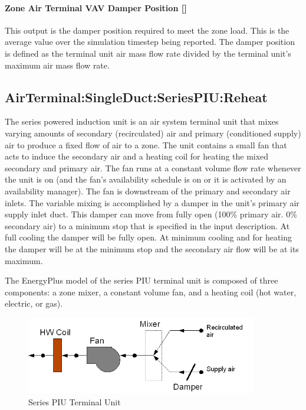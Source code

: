 \paragraph{Zone Air Terminal VAV Damper Position {[]}}\label{zone-air-terminal-vav-damper-position-4}

This output is the damper position required to meet the zone load. This is the average value over the simulation timestep being reported. The damper position is defined as the terminal unit air mass flow rate divided by the terminal unit's maximum air mass flow rate.

\subsection{AirTerminal:SingleDuct:SeriesPIU:Reheat}\label{airterminalsingleductseriespiureheat}

The series powered induction unit is an air system terminal unit that mixes varying amounts of secondary (recirculated) air and primary (conditioned supply) air to produce a fixed flow of air to a zone. The unit contains a small fan that acts to induce the secondary air and a heating coil for heating the mixed secondary and primary air. The fan runs at a constant volume flow rate whenever the unit is on (and the fan's availability schedule is on or it is activated by an availability manager). The fan is downstream of the primary and secondary air inlets. The variable mixing is accomplished by a damper in the unit's primary air supply inlet duct. This damper can move from fully open (100\% primary air. 0\% secondary air) to a minimum stop that is specified in the input description. At full cooling the damper will be fully open. At minimum cooling and for heating the damper will be at the minimum stop and the secondary air flow will be at its maximum.

The EnergyPlus model of the series PIU terminal unit is composed of three components: a zone mixer, a constant volume fan, and a heating coil (hot water, electric, or gas).

\begin{figure}[hbtp] %
\centering
\includegraphics[width=0.9\textwidth, height=0.9\textheight, keepaspectratio=true]{media/image269.png}
\caption{Series PIU Terminal Unit \protect \label{fig:series-piu-terminal-unit}}
\end{figure}


